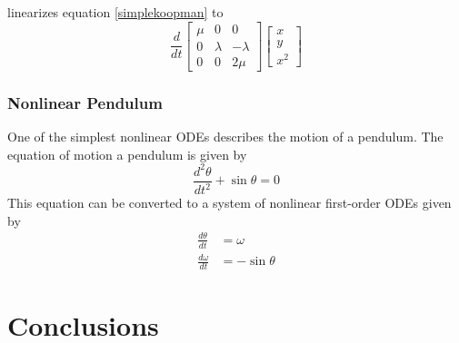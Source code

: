 \documentclass{article}
\begin{document}
linearizes equation \ref{simplekoopman} to
\[ \frac{d}{dt} \begin{bmatrix}
\mu & 0 & 0 \\
0 & \lambda & -\lambda \\
0 & 0 & 2 \mu
\end{bmatrix} \begin{bmatrix}
x \\
y \\
x^2
\end{bmatrix}
\]







\subsubsection{Nonlinear Pendulum}
One of the simplest nonlinear ODEs describes the motion of a pendulum. The equation of motion a pendulum is given by
\[ \frac{d^2 \theta}{d t^2} + \sin \theta = 0 \]
This equation can be converted to a system of nonlinear first-order ODEs given by
\begin{align*}
\frac{d\theta}{dt} &= \omega \\
\frac{d\omega}{dt} &= -\sin \theta
\end{align*}







\section{Conclusions}




\nocite{langley00}



\end{document}
